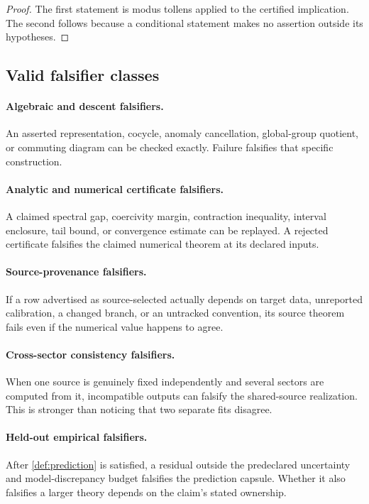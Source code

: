 \documentclass[11pt]{article}
\begin{document}
\begin{proof}
The first statement is modus tollens applied to the certified implication.
The second follows because a conditional statement makes no assertion outside
its hypotheses.
\end{proof}

\subsection{Valid falsifier classes}

\paragraph{Algebraic and descent falsifiers.}
An asserted representation, cocycle, anomaly cancellation, global-group
quotient, or commuting diagram can be checked exactly. Failure falsifies that
specific construction.

\paragraph{Analytic and numerical certificate falsifiers.}
A claimed spectral gap, coercivity margin, contraction inequality, interval
enclosure, tail bound, or convergence estimate can be replayed. A rejected
certificate falsifies the claimed numerical theorem at its declared inputs.

\paragraph{Source-provenance falsifiers.}
If a row advertised as source-selected actually depends on target data,
unreported calibration, a changed branch, or an untracked convention, its
source theorem fails even if the numerical value happens to agree.

\paragraph{Cross-sector consistency falsifiers.}
When one source is genuinely fixed independently and several sectors are
computed from it, incompatible outputs can falsify the shared-source
realization. This is stronger than noticing that two separate fits disagree.

\paragraph{Held-out empirical falsifiers.}
After \cref{def:prediction} is satisfied, a residual outside the predeclared
uncertainty and model-discrepancy budget falsifies the prediction capsule.
Whether it also falsifies a larger theory depends on the claim's stated
ownership.
\end{document}

